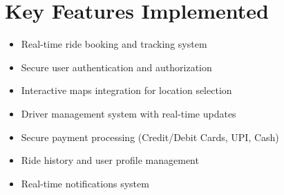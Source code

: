 \documentclass[letterpaper,11pt]{article}
\newcommand{\resumeItem}[1]{
  \item\small{
    {#1 \vspace{-2pt}}
  }
}
\newcommand{\resumeSubItem}[1]{\resumeItem{#1}\vspace{-4pt}}
\newcommand{\resumeSubHeadingListStart}{\begin{itemize}[leftmargin=0.15in, label={}]}
\newcommand{\resumeSubHeadingListEnd}{\end{itemize}}
\begin{document}
\section{Key Features Implemented}
  \resumeSubHeadingListStart
    \resumeSubItem{Real-time ride booking and tracking system}
    \resumeSubItem{Secure user authentication and authorization}
    \resumeSubItem{Interactive maps integration for location selection}
    \resumeSubItem{Driver management system with real-time updates}
    \resumeSubItem{Secure payment processing (Credit/Debit Cards, UPI, Cash)}
    \resumeSubItem{Ride history and user profile management}
    \resumeSubItem{Real-time notifications system}
  \resumeSubHeadingListEnd
\end{document}
